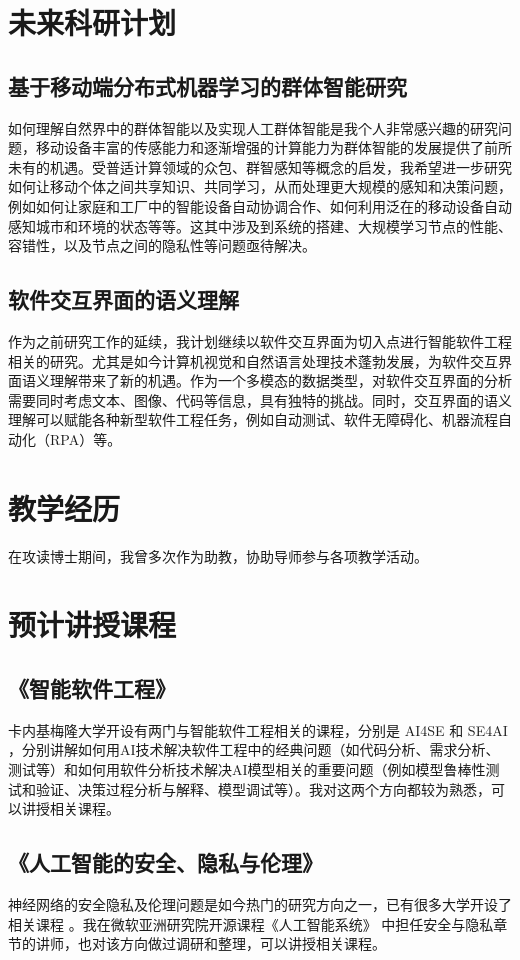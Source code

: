 \documentclass[12pt]{article}
\begin{document}
\section{未来科研计划}

\subsection{基于移动端分布式机器学习的群体智能研究}
如何理解自然界中的群体智能以及实现人工群体智能是我个人非常感兴趣的研究问题，移动设备丰富的传感能力和逐渐增强的计算能力为群体智能的发展提供了前所未有的机遇。受普适计算领域的众包、群智感知等概念的启发，我希望进一步研究如何让移动个体之间共享知识、共同学习，从而处理更大规模的感知和决策问题，例如如何让家庭和工厂中的智能设备自动协调合作、如何利用泛在的移动设备自动感知城市和环境的状态等等。这其中涉及到系统的搭建、大规模学习节点的性能、容错性，以及节点之间的隐私性等问题亟待解决。

\subsection{软件交互界面的语义理解}
作为之前研究工作的延续，我计划继续以软件交互界面为切入点进行智能软件工程相关的研究。尤其是如今计算机视觉和自然语言处理技术蓬勃发展，为软件交互界面语义理解带来了新的机遇。作为一个多模态的数据类型，对软件交互界面的分析需要同时考虑文本、图像、代码等信息，具有独特的挑战。同时，交互界面的语义理解可以赋能各种新型软件工程任务，例如自动测试、软件无障碍化、机器流程自动化（RPA）等。

\section{教学经历}

在攻读博士期间，我曾多次作为助教，协助导师参与各项教学活动。

\section{预计讲授课程}

\subsection{《智能软件工程》}
卡内基梅隆大学开设有两门与智能软件工程相关的课程，分别是 AI4SE \cite{cmu:ai4se} 和 SE4AI \cite{cmu:se4ai}，分别讲解如何用AI技术解决软件工程中的经典问题（如代码分析、需求分析、测试等）和如何用软件分析技术解决AI模型相关的重要问题（例如模型鲁棒性测试和验证、决策过程分析与解释、模型调试等）。我对这两个方向都较为熟悉，可以讲授相关课程。

\subsection{《人工智能的安全、隐私与伦理》}
神经网络的安全隐私及伦理问题是如今热门的研究方向之一，已有很多大学开设了相关课程 \cite{ucb:trustworthy,ucb:fairness}。我在微软亚洲研究院开源课程《人工智能系统》 \cite{microsoft:ai-system}中担任安全与隐私章节的讲师，也对该方向做过调研和整理，可以讲授相关课程。


{


}
\end{document}
